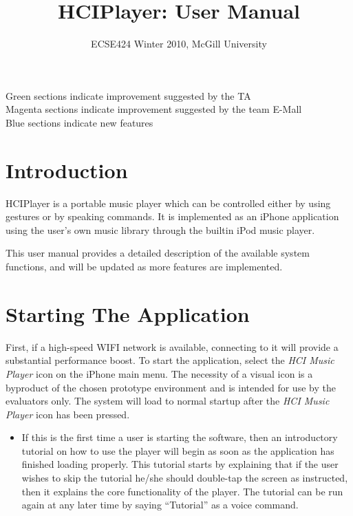 \documentclass[12pt,letterpaper]{article}
\begin{document}
\title{HCIPlayer: User Manual}
\author{ECSE424 Winter 2010, McGill University}
\renewcommand{\today}{Updated: Wednesday, March 24th, 2010}
\maketitle

\begin{center}
{\color{green} Green} sections indicate improvement suggested by the TA \\
{\color{magenta} Magenta} sections indicate improvement suggested by the team E-Mall \\
{\color{blue} Blue} sections indicate new features
\end{center}

\section{Introduction}

HCIPlayer is a portable music player which can be controlled either by using gestures or by speaking commands. It is implemented as an iPhone application using the user's own music library through the builtin iPod music player.

This user manual provides a detailed description of the available system functions, and will be updated as more features are implemented.

\section{Starting The Application}
First, if a high-speed WIFI network is available, connecting to it will provide a substantial performance boost. To start the application, select the \emph{HCI Music Player} icon on the iPhone main menu. The necessity of a visual icon is a byproduct of the chosen prototype environment and is intended for use by the evaluators only. The system will load to normal startup after the \emph{HCI Music Player} icon has been pressed.
\begin{itemize}
\item If this is the first time a user is starting the software, then an introductory tutorial on how to use the player will begin as soon as the application has finished loading properly. This tutorial starts by explaining that if the user wishes to skip the tutorial he/she should double-tap the screen as instructed, then it explains the core functionality of the player. {\color{blue} The tutorial can be run again at any later time by saying ``Tutorial'' as a voice command.}
\end{itemize}
\end{document}
